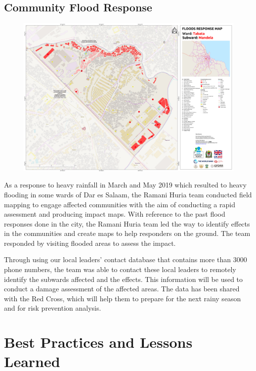 \documentclass[a4paper,12pt,twoside]{article}
\begin{document}
\newpage
\setlength{\parskip}{0.7em}
\subsection{Community Flood Response}

\begin{figure}[h]
    \centering
    \includegraphics[width=.75\textwidth]{images/mandelaexample.PNG}
    \label{fig:my_label}
\end{figure}

As a response to heavy rainfall in March and May 2019 which resulted to heavy flooding in some wards of Dar es Salaam, the Ramani Huria team conducted field mapping to engage affected communities with the aim of conducting a rapid assessment and producing impact maps. With reference to the past flood responses done in the city, the Ramani Huria team led the way to identify effects in the communities and create maps to help responders on the ground. The team responded by visiting flooded areas to assess the impact.

Through using our local leaders’ contact database that contains more than 3000 phone numbers, the team was able to contact these local leaders to remotely identify the subwards affected and the effects.
This information will be used to conduct a damage assessment of the affected areas. The data has been shared with the Red Cross, which will help them to prepare for the next rainy season and for risk prevention analysis.

\section{Best Practices and Lessons Learned}

\end{document}
